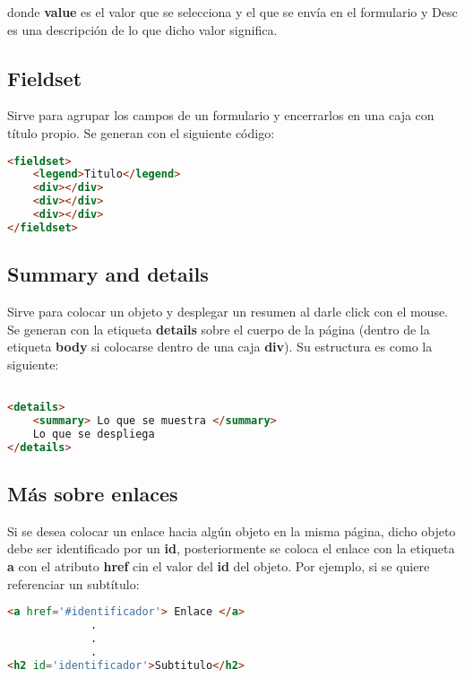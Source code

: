\documentclass[10pt,oneside]{article}
\begin{document}
\begin{multicols}{2}
    donde \textbf{value} es el valor  que se selecciona y el que se envía en el formulario y Desc es una descripción de lo que dicho valor significa.
        
\subsection{Fieldset}

    Sirve para agrupar los campos de un formulario y encerrarlos en una caja con título propio. Se generan con el siguiente código:

    \begin{lstlisting}[language=HTML]
<fieldset>
    <legend>Titulo</legend>
    <div></div>
    <div></div>
    <div></div>
</fieldset>        
    \end{lstlisting}
    
\subsection{Summary and details}

    Sirve para colocar un objeto y desplegar un resumen al darle click con el mouse. Se generan con la etiqueta \textbf{details} sobre el cuerpo de la página (dentro de la etiqueta \textbf{body} si colocarse dentro de una caja \textbf{div}). Su estructura es como la siguiente:

    \begin{lstlisting}[language=HTML]

<details>
    <summary> Lo que se muestra </summary>
    Lo que se despliega        
</details>

    \end{lstlisting}
        
\subsection{Más sobre enlaces}

    Si se desea colocar un enlace hacia algún objeto en la misma página, dicho objeto debe ser identificado por un \textbf{id}, posteriormente se coloca el enlace con la etiqueta \textbf{a} con el atributo \textbf{href} cin el valor del \textbf{id} del objeto. Por ejemplo, si se quiere referenciar un subtítulo:

    \begin{lstlisting}[language=HTML]
<a href='#identificador'> Enlace </a>
             .
             .
             .
<h2 id='identificador'>Subtitulo</h2>
    \end{lstlisting}


\end{multicols}
\end{document}

